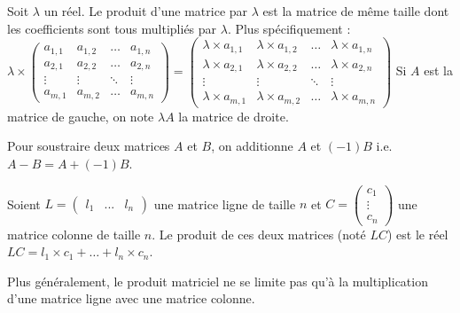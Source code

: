 	\begin{formula}
		Soit $\lambda$ un réel. Le produit d'une matrice par $\lambda$ est la matrice de même taille dont les coefficients sont tous multipliés par $\lambda$. Plus spécifiquement :
		\newpar
		$\displaystyle{\lambda \times \begin{pmatrix}a_{1,1} & a_{1,2} & \dots & a_{1,n} \\ a_{2,1} & a_{2,2} & \dots & a_{2,n} \\ \vdots & \vdots & \ddots & \vdots \\ a_{m,1} & a_{m,2} & \dots & a_{m,n}\end{pmatrix} = \begin{pmatrix}\lambda \times a_{1,1} & \lambda \times a_{1,2} & \dots & \lambda \times a_{1,n} \\ \lambda \times a_{2,1} & \lambda \times a_{2,2} & \dots & \lambda \times a_{2,n} \\ \vdots & \vdots & \ddots & \vdots \\ \lambda \times a_{m,1} & \lambda \times a_{m,2} & \dots & \lambda \times a_{m,n}\end{pmatrix}}$
		\newpar
		Si $A$ est la matrice de gauche, on note $\lambda A$ la matrice de droite.
	\end{formula}

	\begin{tip}
		Pour soustraire deux matrices $A$ et $B$, on additionne $A$ et $(-1)B$ i.e. $A - B = A + (-1)B$.
	\end{tip}

	\begin{formula}
		Soient $L = \begin{pmatrix}l_1 & ... & l_n\end{pmatrix}$ une matrice ligne de taille $n$ et $C = \begin{pmatrix}c_1 \\ \vdots \\ c_n\end{pmatrix}$ une matrice colonne de taille $n$.
		\newpar
		Le produit de ces deux matrices (noté $LC$) est le réel $LC = l_1 \times c_1 + \dots + l_n \times c_n$.
	\end{formula}

	Plus généralement, le produit matriciel ne se limite pas qu'à la multiplication d'une matrice ligne avec une matrice colonne.

